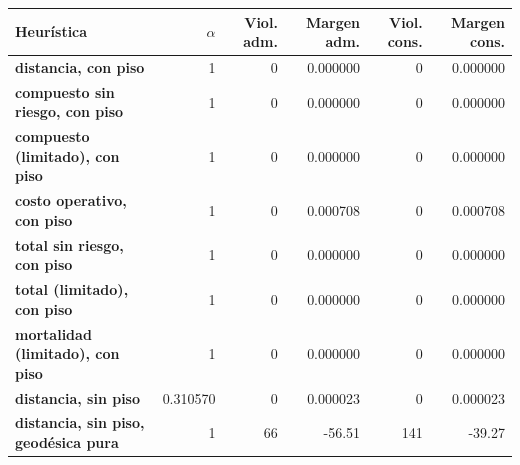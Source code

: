 \renewcommand{\arraystretch}{1.2}
\begin{tabular}{|l|r|r|r|r|r|}
\hline
\rowcolor{gray!20} \textbf{Heurística} & \textbf{$\alpha$} & \textbf{Viol. adm.} & \textbf{Margen adm.} & \textbf{Viol. cons.} & \textbf{Margen cons.} \\
\hline
\textbf{distancia, con piso} & 1 & 0 & 0.000000 & 0 & 0.000000 \\
\hline
\textbf{compuesto sin riesgo, con piso} & 1 & 0 & 0.000000 & 0 & 0.000000 \\
\hline
\textbf{compuesto (limitado), con piso} & 1 & 0 & 0.000000 & 0 & 0.000000 \\
\hline
\textbf{costo operativo, con piso} & 1 & 0 & 0.000708 & 0 & 0.000708 \\
\hline
\textbf{total sin riesgo, con piso} & 1 & 0 & 0.000000 & 0 & 0.000000 \\
\hline
\textbf{total (limitado), con piso} & 1 & 0 & 0.000000 & 0 & 0.000000 \\
\hline
\textbf{mortalidad (limitado), con piso} & 1 & 0 & 0.000000 & 0 & 0.000000 \\
\hline
\textbf{distancia, sin piso} & 0.310570 & 0 & 0.000023 & 0 & 0.000023 \\
\hline
\textbf{distancia, sin piso, geodésica pura} & 1 & 66 & -56.51 & 141 & -39.27 \\
\hline
\end{tabular}
